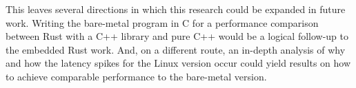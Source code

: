 This leaves several directions in which this research could be expanded in future work.
Writing the bare-metal program in C for a performance comparison between Rust with a C++ library and pure C++ would be a logical follow-up to the embedded Rust work.
And, on a different route, an in-depth analysis of why and how the latency spikes for the Linux version occur could yield results on how to achieve comparable performance to the bare-metal version.
